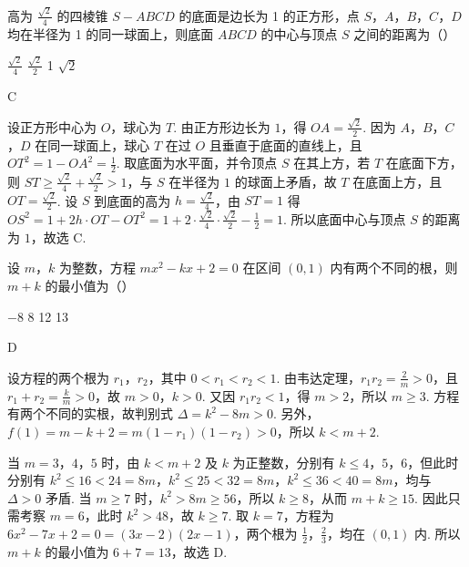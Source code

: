 \begin{problem}
高为 \(\frac{\sqrt{2}}{4}\) 的四棱锥 \(S - ABCD\) 的底面是边长为 1 的正方形，点 \(S\)，\(A\)，\(B\)，\(C\)，\(D\) 均在半径为 1 的同一球面上，则底面 \(ABCD\) 的中心与顶点 \(S\) 之间的距离为（\quad）

\choices
    {\( \frac{\sqrt{2}}{4} \)}
    {\( \frac{\sqrt{2}}{2} \)}
    {1}
    {\(\sqrt{2}\)}
\begin{answer}
C
\end{answer}

\begin{solution}
设正方形中心为 \(O\)，球心为 \(T\). 由正方形边长为 \(1\)，得 \(OA=\frac{\sqrt{2}}{2}\). 因为 \(A\)，\(B\)，\(C\)，\(D\) 在同一球面上，球心 \(T\) 在过 \(O\) 且垂直于底面的直线上，且 \(OT^2=1-OA^2=\frac{1}{2}\). 取底面为水平面，并令顶点 \(S\) 在其上方，若 \(T\) 在底面下方，则 \(ST\geqslant\frac{\sqrt{2}}{4}+\frac{\sqrt{2}}{2}>1\)，与 \(S\) 在半径为 \(1\) 的球面上矛盾，故 \(T\) 在底面上方，且 \(OT=\frac{\sqrt{2}}{2}\). 设 \(S\) 到底面的高为 \(h=\frac{\sqrt{2}}{4}\)，由 \(ST=1\) 得
\(OS^2=1+2h\cdot OT-OT^2=1+2\cdot\frac{\sqrt{2}}{4}\cdot\frac{\sqrt{2}}{2}-\frac{1}{2}=1\). 所以底面中心与顶点 \(S\) 的距离为 \(1\)，故选 C.
\end{solution}
\end{problem}

\begin{problem}
设 \(m\)，\(k\) 为整数，方程 \(mx^2 - kx + 2 = 0\) 在区间 \((0,1)\) 内有两个不同的根，则 \(m + k\) 的最小值为（\quad）

\choices
    {\(-8\)}
    {8}
    {12}
    {13}
\begin{answer}
D
\end{answer}

\begin{solution}
设方程的两个根为 \(r_1\)，\(r_2\)，其中 \(0<r_1<r_2<1\). 由韦达定理，\(r_1r_2=\frac{2}{m}>0\)，且 \(r_1+r_2=\frac{k}{m}>0\)，故 \(m>0\)，\(k>0\). 又因 \(r_1r_2<1\)，得 \(m>2\)，所以 \(m\geqslant3\). 方程有两个不同的实根，故判别式 \(\Delta=k^2-8m>0\). 另外，\(f(1)=m-k+2=m(1-r_1)(1-r_2)>0\)，所以 \(k<m+2\).

当 \(m=3\)，\(4\)，\(5\) 时，由 \(k<m+2\) 及 \(k\) 为正整数，分别有 \(k\leqslant4\)，\(5\)，\(6\)，但此时分别有 \(k^2\leqslant16<24=8m\)，\(k^2\leqslant25<32=8m\)，\(k^2\leqslant36<40=8m\)，均与 \(\Delta>0\) 矛盾. 当 \(m\geqslant7\) 时，\(k^2>8m\geqslant56\)，所以 \(k\geqslant8\)，从而 \(m+k\geqslant15\). 因此只需考察 \(m=6\)，此时 \(k^2>48\)，故 \(k\geqslant7\). 取 \(k=7\)，方程为 \(6x^2-7x+2=0=(3x-2)(2x-1)\)，两个根为 \(\frac{1}{2}\)，\(\frac{2}{3}\)，均在 \((0,1)\) 内. 所以 \(m+k\) 的最小值为 \(6+7=13\)，故选 D.
\end{solution}
\end{problem}

